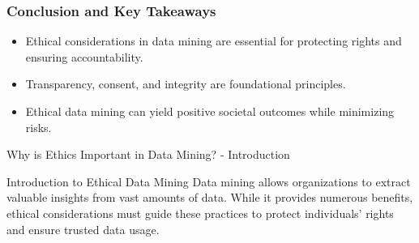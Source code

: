 \documentclass[aspectratio=169]{beamer}
\begin{document}
\begin{frame}[fragile]
    \frametitle{Conclusion and Key Takeaways}
    \begin{itemize}
        \item Ethical considerations in data mining are essential for protecting rights and ensuring accountability.
        \item Transparency, consent, and integrity are foundational principles.
        \item Ethical data mining can yield positive societal outcomes while minimizing risks.
    \end{itemize}
\end{frame}

\begin{frame}[fragile]{Why is Ethics Important in Data Mining? - Introduction}
    \begin{block}{Introduction to Ethical Data Mining}
        Data mining allows organizations to extract valuable insights from vast amounts of data. While it provides numerous benefits, ethical considerations must guide these practices to protect individuals’ rights and ensure trusted data usage. 
    \end{block}
\end{frame}
\end{document}
